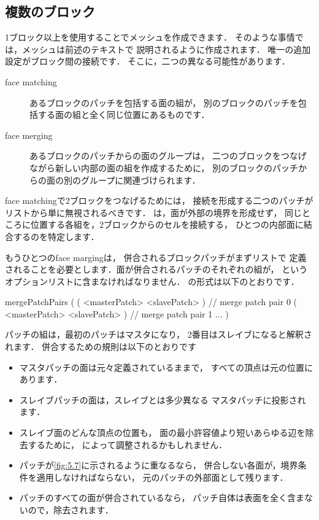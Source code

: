 \subsection{複数のブロック}
\label{ssec:5.3.2}
1ブロック以上を使用することでメッシュを作成できます．
そのような事情では，メッシュは前述のテキストで
説明されるように作成されます．
唯一の追加設定がブロック間の接続です．
そこに，二つの異なる可能性があります．
\begin{description}
 \item[face matching]
            あるブロックのパッチを包括する面の組が，
            別のブロックのパッチを包括する面の組と全く同じ位置にあるものです．
 \item[face merging]
            あるブロックのパッチからの面のグループは，
            二つのブロックをつなげながら新しい内部の面の組を作成するために，
            別のブロックのパッチからの面の別のグループに関連づけられます．
\end{description}
face matchingで2ブロックをつなげるためには，
接続を形成する二つのパッチが
リストから単に無視されるべきです．
は，面が外部の境界を形成せず，
同じところに位置する各組を，2ブロックからのセルを接続する，
ひとつの内部面に結合するのを特定します．

もうひとつのface margingは，
併合されるブロックパッチがまずリストで
定義されることを必要とします．面が併合されるパッチのそれぞれの組が，
というオプションリストに含まなければなりません．
の形式は以下のとおりです．
\begin{OFverbatim}[file]
mergePatchPairs
(
( <masterPatch> <slavePatch> ) // merge patch pair 0
( <masterPatch> <slavePatch> ) // merge patch pair 1
...
)
\end{OFverbatim}
パッチの組は，最初のパッチはマスタになり，
2番目はスレイブになると解釈されます．
併合するための規則は以下のとおりです
\begin{itemize}
 \item マスタパッチの面は元々定義されているままで，
       すべての頂点は元の位置にあります．
 \item スレイブパッチの面は，スレイブとは多少異なる
       マスタパッチに投影されます．
 \item スレイブ面のどんな頂点の位置も，
       面の最小許容値より短いあらゆる辺を除去するために，
       によって調整されるかもしれません．
 \item パッチが\autoref{fig:5.7}に示されるように重なるなら，
       併合しない各面が，境界条件を適用しなければならない，
       元のパッチの外部面として残ります．
 \item パッチのすべての面が併合されているなら，
       パッチ自体は表面を全く含まないので，除去されます．
\end{itemize}



